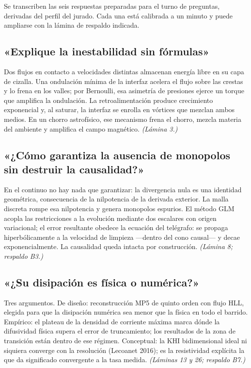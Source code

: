 \documentclass[11pt,letterpaper]{article}
\begin{document}
Se transcriben las seis respuestas preparadas para el turno de preguntas,
derivadas del perfil del jurado. Cada una está calibrada a un minuto y
puede ampliarse con la lámina de respaldo indicada.

\subsection{«Explique la inestabilidad sin fórmulas»}
Dos flujos en contacto a velocidades distintas almacenan energía libre en
su capa de cizalla. Una ondulación mínima de la interfaz acelera el flujo
sobre las crestas y lo frena en los valles; por Bernoulli, esa asimetría
de presiones ejerce un torque que amplifica la ondulación. La
retroalimentación produce crecimiento exponencial y, al saturar, la
interfaz se enrolla en vórtices que mezclan ambos medios. En un chorro
astrofísico, ese mecanismo frena el chorro, mezcla materia del ambiente y
amplifica el campo magnético. \emph{(Lámina 3.)}

\subsection{«¿Cómo garantiza la ausencia de monopolos sin destruir la causalidad?»}
En el continuo no hay nada que garantizar: la divergencia nula es una
identidad geométrica, consecuencia de la nilpotencia de la derivada
exterior. La malla discreta rompe esa nilpotencia y genera monopolos
espurios. El método GLM acopla las restricciones a la evolución mediante
dos escalares con origen variacional; el error resultante obedece la
ecuación del telégrafo: se propaga hiperbólicamente a la velocidad de
limpieza ---dentro del cono causal--- y decae exponencialmente. La
causalidad queda intacta por construcción. \emph{(Lámina 8; respaldo B3.)}

\subsection{«¿Su disipación es física o numérica?»}
Tres argumentos. De diseño: reconstrucción MP5 de quinto orden con flujo
HLL, elegida para que la disipación numérica sea menor que la física en
todo el barrido. Empírico: el plateau de la densidad de corriente máxima
marca dónde la difusividad física supera el error de truncamiento; los
resultados de la zona de transición están dentro de ese régimen.
Conceptual: la KHI bidimensional ideal ni siquiera converge con la
resolución (Lecoanet 2016); es la resistividad explícita la que da
significado convergente a la tasa medida. \emph{(Láminas 13 y 26;
respaldo B7.)}
\end{document}
